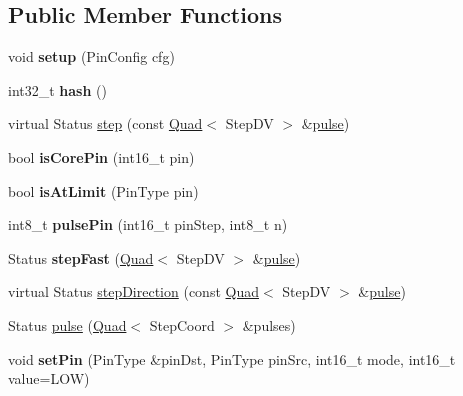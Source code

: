 \subsection*{Public Member Functions}
\begin{DoxyCompactItemize}
\item 
\hypertarget{classfirestep_1_1_machine_a4b0eee05edc1cdd59749b27099a8fdee}{void {\bfseries setup} (Pin\+Config cfg)}\label{classfirestep_1_1_machine_a4b0eee05edc1cdd59749b27099a8fdee}

\item 
\hypertarget{classfirestep_1_1_machine_a60063b1edb804c45b0b10babf539582a}{int32\+\_\+t {\bfseries hash} ()}\label{classfirestep_1_1_machine_a60063b1edb804c45b0b10babf539582a}

\item 
virtual Status \hyperlink{classfirestep_1_1_machine_a581b2333ca877f4ea4c020eaaaf485f3}{step} (const \hyperlink{classfirestep_1_1_quad}{Quad}$<$ Step\+D\+V $>$ \&\hyperlink{classfirestep_1_1_machine_a01596c1eb82ee853417f77404317c4ed}{pulse})
\item 
\hypertarget{classfirestep_1_1_machine_a97d0850669e905e5adca4933f649342d}{bool {\bfseries is\+Core\+Pin} (int16\+\_\+t pin)}\label{classfirestep_1_1_machine_a97d0850669e905e5adca4933f649342d}

\item 
\hypertarget{classfirestep_1_1_machine_a3c5a08b9a838939ab4d58b474dd53fc4}{bool {\bfseries is\+At\+Limit} (Pin\+Type pin)}\label{classfirestep_1_1_machine_a3c5a08b9a838939ab4d58b474dd53fc4}

\item 
\hypertarget{classfirestep_1_1_machine_a87a7f34fb93980c64fa04f36ff86eae3}{int8\+\_\+t {\bfseries pulse\+Pin} (int16\+\_\+t pin\+Step, int8\+\_\+t n)}\label{classfirestep_1_1_machine_a87a7f34fb93980c64fa04f36ff86eae3}

\item 
\hypertarget{classfirestep_1_1_machine_ac40d24bb9d52ecac4c0370221c9364ff}{Status {\bfseries step\+Fast} (\hyperlink{classfirestep_1_1_quad}{Quad}$<$ Step\+D\+V $>$ \&\hyperlink{classfirestep_1_1_machine_a01596c1eb82ee853417f77404317c4ed}{pulse})}\label{classfirestep_1_1_machine_ac40d24bb9d52ecac4c0370221c9364ff}

\item 
virtual Status \hyperlink{classfirestep_1_1_machine_ad3cfb55e4071b4d20855175beb21ed6a}{step\+Direction} (const \hyperlink{classfirestep_1_1_quad}{Quad}$<$ Step\+D\+V $>$ \&\hyperlink{classfirestep_1_1_machine_a01596c1eb82ee853417f77404317c4ed}{pulse})
\item 
Status \hyperlink{classfirestep_1_1_machine_a01596c1eb82ee853417f77404317c4ed}{pulse} (\hyperlink{classfirestep_1_1_quad}{Quad}$<$ Step\+Coord $>$ \&pulses)
\item 
\hypertarget{classfirestep_1_1_machine_a78860fbc2ac4433bc2f690db1019d8b9}{void {\bfseries set\+Pin} (Pin\+Type \&pin\+Dst, Pin\+Type pin\+Src, int16\+\_\+t mode, int16\+\_\+t value=L\+O\+W)}\label{classfirestep_1_1_machine_a78860fbc2ac4433bc2f690db1019d8b9}


\end{DoxyCompactItemize}
